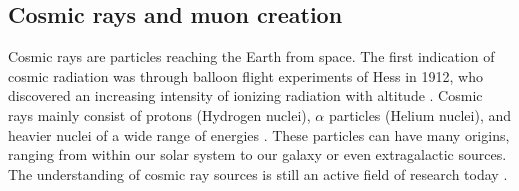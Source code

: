 \subsection{Cosmic rays and muon creation}
\label{sec:AtmosphericMuons-Cosmics}

Cosmic rays are particles reaching the Earth from space. The first indication of cosmic radiation was through balloon flight experiments of Hess in 1912, who discovered an increasing intensity of ionizing radiation with altitude \cite{Cosmics-Hess,Cosmics-Grupen}. Cosmic rays mainly consist of protons (Hydrogen nuclei), $\alpha$ particles (Helium nuclei), and heavier nuclei of a wide range of energies \cite{PDG2022,Cosmics-Gaisser,Book-Grieder}. These particles can have many origins, ranging from within our solar system to our galaxy or even extragalactic sources. The understanding of cosmic ray sources is still an active field of research today \cite{Cosmics-Gaisser,Cosmics-Bindi}.
